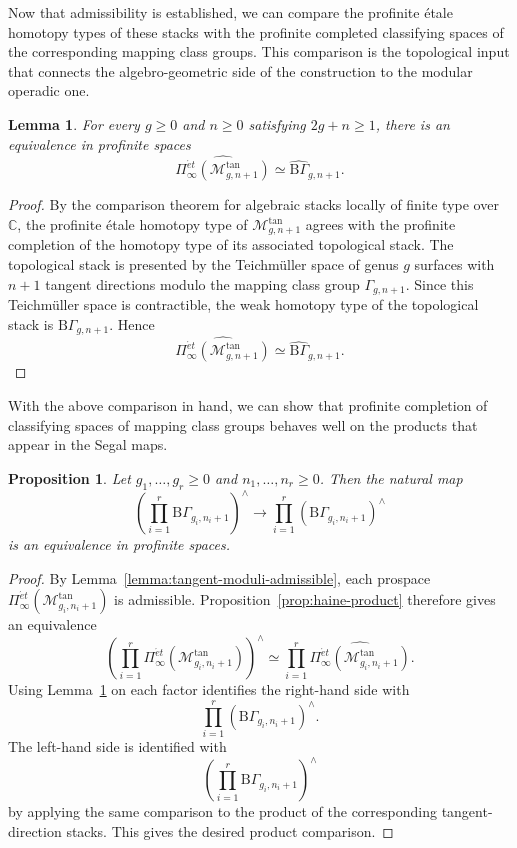\documentclass{amsart}
\newcommand{\cs}{\mathrm{B}}
\newtheorem{prop}[theorem]{Proposition}%
\newtheorem{lemma}[theorem]{Lemma}%
\theoremstyle{definition}
\numberwithin{equation}{section}
\begin{document}
Now that admissibility is established, we can compare the profinite étale homotopy types of these stacks with the profinite completed classifying spaces of the corresponding mapping class groups. This comparison is the topological input that connects the algebro-geometric side of the construction to the modular operadic one.
\begin{lemma}\label{lemma:tangent-moduli-comparison}
For every $g\geq 0$ and $n\geq 0$ satisfying $2g+n\geq 1$, there is an equivalence in profinite spaces
\[
\widehat{\Pi_\infty^{\acute et}(\mathcal M_{g,n+1}^{\tan})}
\simeq
\widehat{\cs\Gamma}_{g,n+1}.
\]
\end{lemma}

\begin{proof}
By the comparison theorem for algebraic stacks locally of finite type over $\mathbb C$, the profinite étale homotopy type of $\mathcal M_{g,n+1}^{\tan}$ agrees with the profinite completion of the homotopy type of its associated topological stack. The topological stack is presented by the Teichmüller space of genus $g$ surfaces with $n+1$ tangent directions modulo the mapping class group $\Gamma_{g,n+1}$. Since this Teichmüller space is contractible, the weak homotopy type of the topological stack is $\cs\Gamma_{g,n+1}$. Hence
\[
\widehat{\Pi_\infty^{\acute et}(\mathcal M_{g,n+1}^{\tan})}
\simeq
\widehat{\cs\Gamma}_{g,n+1}.
\]
\end{proof}

With the above comparison in hand, we can show that profinite completion of classifying spaces of mapping class groups behaves well on the products that appear in the Segal maps. 

\begin{prop}\label{prop:haine-boundary-product}
Let $g_1,\ldots,g_r\geq 0$ and $n_1,\ldots,n_r\geq 0$. Then the natural map
\[
\left(\prod_{i=1}^r \cs\Gamma_{g_i,n_i+1}\right)^{\wedge}
\longrightarrow
\prod_{i=1}^r(\cs\Gamma_{g_i,n_i+1})^{\wedge}
\]
is an equivalence in profinite spaces.
\end{prop}

\begin{proof}
By Lemma~\ref{lemma:tangent-moduli-admissible}, each prospace
$\Pi_\infty^{\acute et}(\mathcal M_{g_i,n_i+1}^{\tan})$ is admissible. Proposition~\ref{prop:haine-product} therefore gives an equivalence
\[
\left(
\prod_{i=1}^r
\Pi_\infty^{\acute et}(\mathcal M_{g_i,n_i+1}^{\tan})
\right)^{\wedge}
\simeq
\prod_{i=1}^r
\widehat{\Pi_\infty^{\acute et}(\mathcal M_{g_i,n_i+1}^{\tan})}.
\]
Using Lemma~\ref{lemma:tangent-moduli-comparison} on each factor identifies the right-hand side with
\[
\prod_{i=1}^r(\cs\Gamma_{g_i,n_i+1})^{\wedge}.
\]
The left-hand side is identified with
\[
\left(\prod_{i=1}^r \cs\Gamma_{g_i,n_i+1}\right)^{\wedge}
\]
by applying the same comparison to the product of the corresponding tangent-direction stacks. This gives the desired product comparison.
\end{proof}
\end{document}

